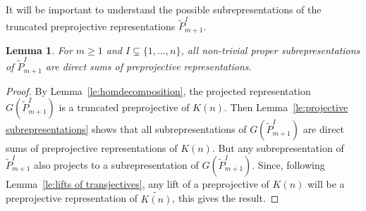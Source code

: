 \documentclass{amsart}
\newtheorem{lemma}[theorem]{Lemma}
\numberwithin{equation}{section}
\begin{document}
It will be important to understand the possible subrepresentations of the truncated preprojective representations $\tilde P_{m+1}^I$.
\begin{lemma}
  \label{le:subrep}
  For $m\ge1$ and $I\subsetneq\{1,\ldots,n\}$, all non-trivial proper subrepresentations of $\tilde P_{m+1}^I$ are direct sums of preprojective representations.	
\end{lemma}
\begin{proof}
  By Lemma~\ref{le:homdecomposition}, the projected representation $G(\tilde P_{m+1}^I)$ is a truncated preprojective of $K(n)$.
  Then Lemma~\ref{le:projective subrepresentations} shows that all subrepresentations of $G(\tilde P_{m+1}^I)$ are direct sums of preprojective representations of $K(n)$.
  But any subrepresentation of $\tilde P_{m+1}^I$ also projects to a subrepresentation of $G(\tilde P_{m+1}^I)$.
  Since, following Lemma~\ref{le:lifts of transjectives}, any lift of a preprojective of $K(n)$ will be a preprojective representation of $\widetilde{K(n)}$, this gives the result.
\end{proof}
\end{document}
